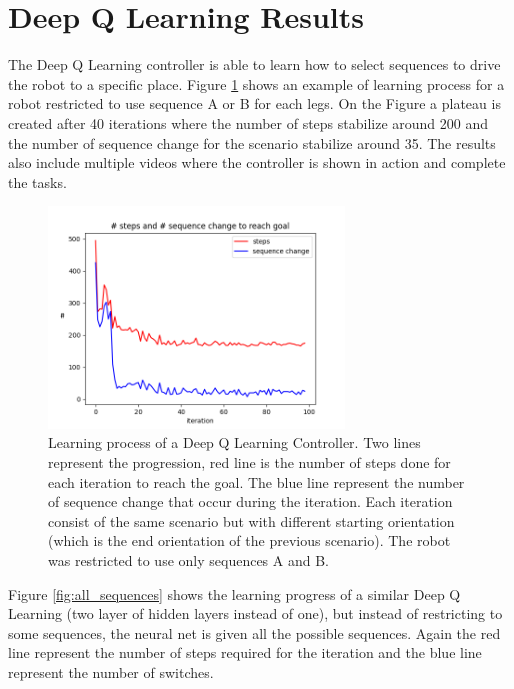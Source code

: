     \section{Deep Q Learning Results}\label{sec:res_qlearning}
        The Deep Q Learning controller is able to learn how to select sequences to drive the robot to a specific place. Figure \ref{fig:dqn_results} shows an example of learning process for a robot restricted to use sequence A or B for each legs. On the Figure a plateau is created after 40 iterations where the number of steps stabilize around 200 and the number of sequence change for the scenario stabilize around 35. The results also include multiple videos where the controller is shown in action and complete the tasks.
        \begin{figure}[h]
            \centering
            \includegraphics[width=0.7\textwidth]{images/AB-0-FALSE.png}
            \caption{Learning process of a Deep Q Learning Controller. Two lines represent the progression, red line is the number of steps done for each iteration to reach the goal. The blue line represent the number of sequence change that occur during the iteration. Each iteration consist of the same scenario but with different starting orientation (which is the end orientation of the previous scenario). The robot was restricted to use only sequences A and B.}
            \label{fig:dqn_results}
        \end{figure}
        
        Figure \ref{fig:all_sequences} shows the learning progress of a similar Deep Q Learning (two layer of hidden layers instead of one), but instead of restricting to some sequences, the neural net is given all the possible sequences. Again the red line represent the number of steps required for the iteration and the blue line represent the number of switches.
        
